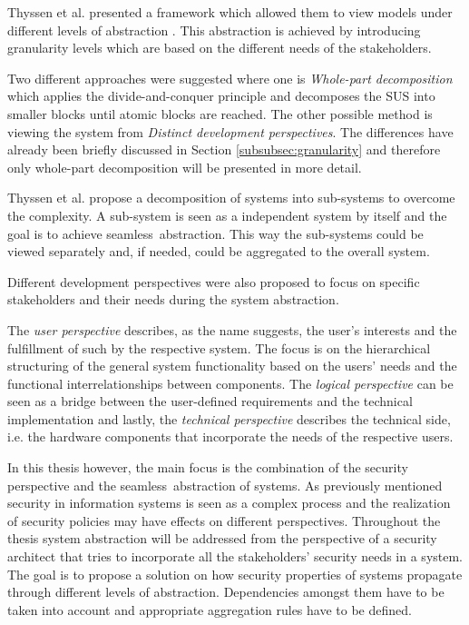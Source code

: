 Thyssen et al. presented a framework which allowed them to view models under different levels of abstraction \cite{thyssen2010system}. This abstraction is achieved by introducing granularity levels which are based on the different needs of the stakeholders. 

Two different approaches were suggested where one is \textit{Whole-part decomposition} which applies the divide-and-conquer principle and decomposes the SUS into smaller blocks until atomic blocks are reached. The other possible method is viewing the system from \textit{Distinct development perspectives}. The differences have already been briefly discussed in Section \ref{subsubsec:granularity} and therefore only whole-part decomposition will be presented in more detail. 

Thyssen et al. propose a decomposition of systems into sub-systems to overcome the complexity. A sub-system is seen as a independent system by itself and the goal is to achieve \glqq seamless\grqq \ abstraction. This way the sub-systems could be viewed separately and, if needed, could be aggregated to the overall system.

Different development perspectives were also proposed to focus on specific stakeholders and their needs during the system abstraction. 

The \textit{user perspective} describes, as the name suggests, the user's interests and the fulfillment of such by the respective system. The focus is on the hierarchical structuring of the general system functionality based on the users' needs and the functional interrelationships between components. The \textit{logical perspective} can be seen as a bridge between the user-defined requirements and the technical implementation and lastly, the \textit{technical perspective} describes the technical side, i.e. the hardware components that incorporate the needs of the respective users.  

In this thesis however, the main focus is the combination of the security perspective and the \glqq seamless\grqq \ abstraction of systems. As previously mentioned security in information systems is seen as a complex process \cite{vacca2012computer} and the realization of security policies may have effects on different perspectives. Throughout the thesis system abstraction will be addressed from the perspective of a security architect that tries to incorporate all the stakeholders' security needs in a system. The goal is to propose a solution on how security properties of systems propagate through different levels of abstraction. Dependencies amongst them have to be taken into account and appropriate aggregation rules have to be defined. 

